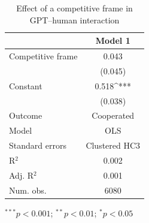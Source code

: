 
\begin{table}[H]
\begin{center}
\begin{threeparttable}
\begin{tabular}{l S[table-format=4.6]}
\toprule
 & {Model 1} \\
\midrule
Competitive frame & 0.043                    \\
                  & (0.045)                  \\
Constant          & 0.518^{***}              \\
                  & (0.038)                  \\
\midrule
Outcome           & {Cooperated}             \\
Model             & {OLS}                    \\
Standard errors   & {{\small Clustered HC3}} \\
R$^2$             & 0.002                    \\
Adj. R$^2$        & 0.001                    \\
Num. obs.         &{6080}                    \\
\bottomrule
\end{tabular}
\begin{tablenotes}[flushleft]
\scriptsize{\item $^{***}p<0.001$; $^{**}p<0.01$; $^{*}p<0.05$}
\end{tablenotes}
\end{threeparttable}
\caption{Effect of a competitive frame in GPT--human interaction}
\label{rt5_models}
\end{center}
\end{table}


